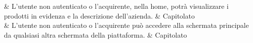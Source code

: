 & L'utente non autenticato o l'acquirente, nella home, potrà visualizzare i prodotti in evidenza e la descrizione dell'azienda. & Capitolato \\

 & L'utente non autenticato o l'acquirente può accedere alla schermata principale da qualsiasi altra schermata della piattaforma. & Capitolato \\
